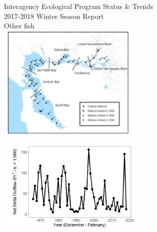\documentclass[]{article}\usepackage[]{graphicx}\usepackage[]{color}
\begin{document}
\begin{Row}
  \begin{Cell}{7}
    \vspace{0.2cm}
    \begin{center}
      \doublespacing
      {\Large Interagency Ecological Program Status \& Trends } \\
      \vspace{0.2cm}
      {\Large 2017-2018 Winter Season Report} \\
      \vspace{0.5cm}
      {\Huge Other fish} \\
      \vspace{0.3cm}
      \includegraphics[width=7cm,align=m]{figures/smelt/map.png}
    \end{center}
  \end{Cell}
  \begin{Cell}{6}
    \vspace{0.2cm}
    \begin{center}
      \includegraphics[width=7cm,trim=0 0 0 0,clip,align=m]{figures/outflow_tmp.png}
    \end{center}
  \end{Cell}
\end{Row}

\vspace{0.5cm}
\end{document}
